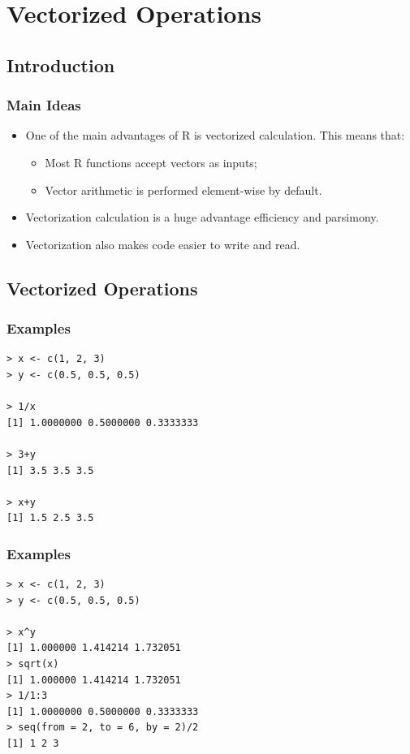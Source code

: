 \documentclass[xcolor=dvipsnames, xcolor=table]{beamer} %
\theoremstyle{mystyle}
\begin{document}
\section{Vectorized Operations}

\subsection{Introduction}

\begin{frame}
\frametitle{Main Ideas}

\begin{itemize}
\item One of the main advantages of R is vectorized calculation. This means that:

\begin{itemize}
\item Most R functions accept vectors as inputs;
\item Vector arithmetic is performed element-wise by default.
\end{itemize}

\item Vectorization calculation is a huge advantage efficiency and parsimony.
\item Vectorization also makes code easier to write and read.

\end{itemize}

\end{frame}

\subsection{Vectorized Operations}

\begin{frame}[fragile]
\frametitle{Examples}

\begin{verbatim}
> x <- c(1, 2, 3)
> y <- c(0.5, 0.5, 0.5)

> 1/x
[1] 1.0000000 0.5000000 0.3333333

> 3+y
[1] 3.5 3.5 3.5

> x+y
[1] 1.5 2.5 3.5
\end{verbatim}

\end{frame}

\begin{frame}[fragile]
\frametitle{Examples}

\begin{verbatim}
> x <- c(1, 2, 3)
> y <- c(0.5, 0.5, 0.5)

> x^y
[1] 1.000000 1.414214 1.732051
> sqrt(x)
[1] 1.000000 1.414214 1.732051
> 1/1:3
[1] 1.0000000 0.5000000 0.3333333
> seq(from = 2, to = 6, by = 2)/2
[1] 1 2 3
\end{verbatim}

\end{frame}
\end{document}
